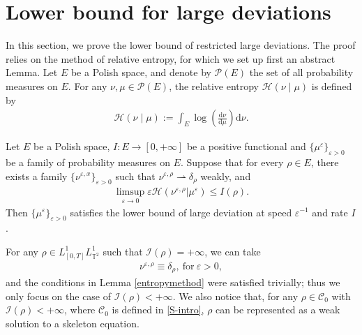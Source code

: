 \section{Lower bound for large deviations}\label{sec:LB-LDP}
In this section, we prove the lower bound of restricted large deviations. The proof relies on the method of relative entropy, for which we set up first an abstract Lemma. Let $E$ be a Polish space, and denote by $\mathcal{P}(E)$ the set of all probability measures on $E$. For any $\nu, \mu \in \mathcal{P}(E)$, the relative entropy $\mathcal{H}(\nu \mid \mu)$ is defined by
\begin{align*}
\mathcal{H}\left (\nu\mid\mu\right):=\int_E \log \left(\frac{\mathrm{d} \nu}{\mathrm{d} \mu}\right) \mathrm{d} \nu .
\end{align*}
\begin{lem}\label{entropymethod}
Let $E$ be a Polish space, $I: E\rightarrow[0,+\infty]$ be a positive functional and $\{\mu^{\varepsilon}\}_{\varepsilon>0} $ be a family of probability measures on $E$. Suppose that for every $\rho \in E$, there exists a family $\{\nu^{\varepsilon,x}\}_{\varepsilon>0}$ such that $\nu^{\varepsilon,\rho}\rightharpoonup\delta_{\rho}$ weakly, and
\begin{align}\label{eq:relative-entropy-bound}
\limsup_{\varepsilon\rightarrow0}\varepsilon \mathcal{H}\left(\nu^{\varepsilon,\rho}|\mu^{\varepsilon}\right)\leq I(\rho).
\end{align}
Then $\{\mu^{\varepsilon}\}_{\varepsilon>0}$ satisfies the lower bound of large deviation at speed $\varepsilon^{-1}$ and rate $I$.
\end{lem}

For any $\rho\in L^1_{[0, T]}L^1_{\mathbb{T}^2}$ such that $\mathcal{I}(\rho)=+\infty$, we can take
\begin{align*}
\nu^{\varepsilon, \rho} \equiv \delta_{\rho}, \ \text{for} \ \varepsilon > 0, 
\end{align*}
and the conditions in Lemma \ref{entropymethod} were satisfied trivially; thus we only focus on the case of $\mathcal{I}(\rho)<+\infty$. We also notice that, for any $\rho \in \mathcal{C}_0$ with $\mathcal{I}(\rho)<+\infty$, where $\mathcal{C}_0$ is defined in \eqref{S-intro}, $\rho$ can be represented as a weak solution to a skeleton equation. 

